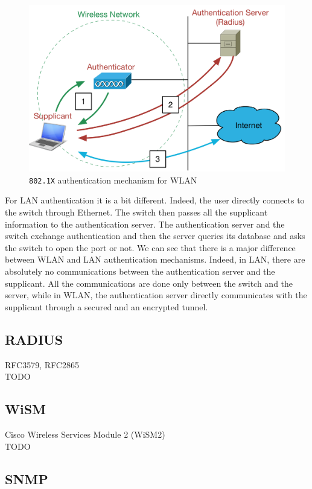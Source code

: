 \begin{figure}[H]
	\begin{center}
	\includegraphics[width=.7\linewidth]{Pictures/Chapter2/802.png}
	\caption{\texttt{802.1X} authentication mechanism for WLAN}
	\end{center}
\end{figure}

For LAN authentication it is a bit different. Indeed, the user directly connects to the switch through Ethernet. The switch then passes all the supplicant information to the authentication server. The authentication server and the switch exchange authentication and then the server queries its database and asks the switch to open the port or not.
We can see that there is a major difference between WLAN and LAN authentication mechanisms. Indeed, in LAN, there are absolutely no communications between the authentication server and the supplicant. All the communications are done only between the switch and the server, while in WLAN, the authentication server directly communicates with the supplicant through a secured and an encrypted tunnel. 



\subsection{RADIUS}
RFC3579, RFC2865\\
TODO

\subsection{WiSM}
Cisco Wireless Services Module 2 (WiSM2)\\
TODO

\subsection{SNMP}

